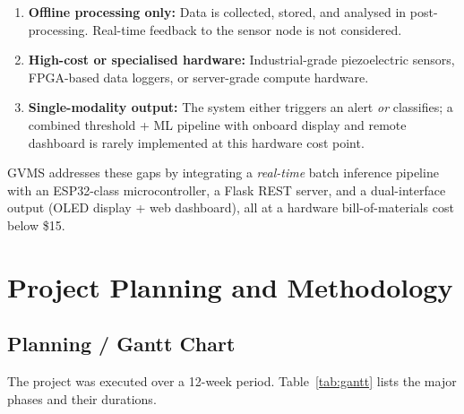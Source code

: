 \documentclass[12pt,a4paper]{report}
\begin{document}
\begin{enumerate}
  \item \textbf{Offline processing only:} Data is collected, stored, and
        analysed in post-processing. Real-time feedback to the sensor node
        is not considered.
  \item \textbf{High-cost or specialised hardware:} Industrial-grade
        piezoelectric sensors, FPGA-based data loggers, or server-grade
        compute hardware.
  \item \textbf{Single-modality output:} The system either triggers an alert
        \emph{or} classifies; a combined threshold + ML pipeline with
        onboard display and remote dashboard is rarely implemented at this
        hardware cost point.
\end{enumerate}

GVMS addresses these gaps by integrating a \emph{real-time} batch inference
pipeline with an ESP32-class microcontroller, a Flask REST server, and a
dual-interface output (OLED display + web dashboard), all at a hardware
bill-of-materials cost below \$15.

\chapter{Project Planning and Methodology}

\section{Planning / Gantt Chart}

The project was executed over a 12-week period. Table~\ref{tab:gantt} lists
the major phases and their durations.
\end{document}
